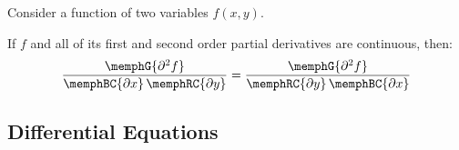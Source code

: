 \begin{multicols}{2}
    \begin{CheatsheetEntryFrame}


        Consider a function of two variables $f(x, y)$.
        
        If $f$ and all of its first and second order partial derivatives are continuous, then:
        \newcommand{\DsqFun}{\memphG{\partial^2{f}}}
        \newcommand{\DX}{\memphBC{\partial{x}}}
        \newcommand{\DY}{\memphRC{\partial{y}}}
        \begin{equation*}
            \frac{\DsqFun}{\DX \, \DY}
            = \frac{\DsqFun}{\DY \, \DX}
        \end{equation*}


    \end{CheatsheetEntryFrame}
    
\end{multicols}


\newpage
\subsection{Differential Equations}%
\label{sub:diff-eq}

